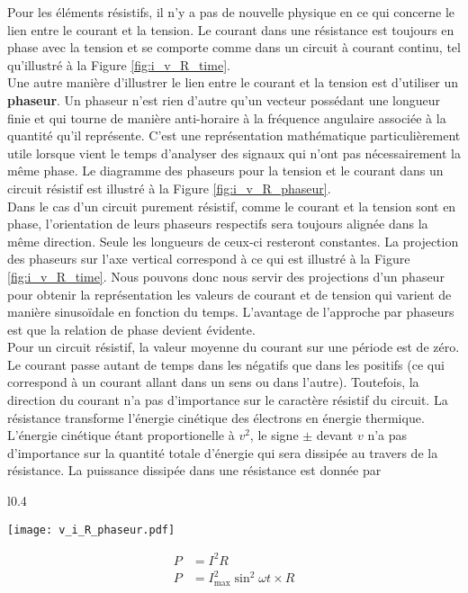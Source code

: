 \documentclass[titlepage,oneside,a4paper,11pt]{book} %
\begin{document}
Pour les éléments résistifs, il n'y a pas de nouvelle physique en ce qui concerne le lien entre le courant et la tension.  Le courant dans une résistance est toujours en phase avec la tension et se comporte comme dans un circuit à courant continu, tel qu'illustré à la Figure \ref{fig:i_v_R_time}.\\


Une autre manière d'illustrer le lien entre le courant et la tension est d'utiliser un \textbf{phaseur}. Un phaseur n'est rien d'autre qu'un vecteur possédant une longueur finie et qui tourne de manière anti-horaire à la fréquence angulaire associée à la quantité qu'il représente.  C'est une représentation mathématique particulièrement utile lorsque vient le temps d'analyser des signaux qui n'ont pas nécessairement la même phase. Le diagramme des phaseurs pour la tension et le courant dans un circuit résistif est illustré à la Figure \ref{fig:i_v_R_phaseur}.\\ 

Dans le cas d'un circuit purement résistif, comme le courant et la tension sont en phase, l'orientation de leurs phaseurs respectifs sera toujours alignée dans la même direction. Seule les longueurs de ceux-ci resteront constantes.
La projection des phaseurs sur l'axe vertical correspond à ce qui est illustré à la Figure \ref{fig:i_v_R_time}. Nous pouvons donc nous servir des projections d'un phaseur pour obtenir la représentation les valeurs de courant et de tension qui varient de manière sinusoïdale en fonction du temps. L'avantage de l'approche par phaseurs est que la relation de phase devient évidente.\\


Pour un circuit résistif, la valeur moyenne du courant sur une période est de zéro. Le courant passe autant de temps dans les négatifs que dans les positifs (ce qui correspond à un courant allant dans un sens ou dans l'autre). Toutefois, la direction du courant n'a pas d'importance sur le caractère résistif du circuit.  La résistance transforme l'énergie cinétique des électrons en énergie thermique. L'énergie cinétique étant proportionelle à $v^2$, le signe $\pm$ devant $v$ n'a pas d'importance sur la quantité totale d'énergie qui sera dissipée au travers de la résistance.  La puissance dissipée dans une résistance est donnée par
\begin{wrapfigure}{l}{0.4\textwidth}
  \begin{center}
    \texttt{[image: v\_i\_R\_phaseur.pdf]}
    \caption{Représentation sous forme de phaseurs pour un circuit purement résistif La longueur des vecteurs (leur valeur maximale) ne change jamais, mais leur orientation, elle, dépend du temps.}
    \label{fig:i_v_R_phaseur}
  \end{center}
\end{wrapfigure}
\begin{align*}
    P&=I^2R\\
    P&=I_{\mathrm{max}}^2\sin^2\omega t\times R
\end{align*}
\end{document}
